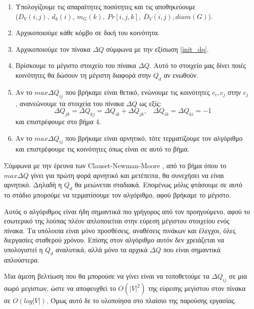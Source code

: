 \documentclass[12pt, letterpaper]{article}
\newcommand{\en}{\selectlanguage{english}}
\newcommand{\gr}{\selectlanguage{greek}}
\begin{document}
\begin{enumerate}
  \item Υπολογίζουμε τις απαραίτητες ποσότητες και τις αποθηκεύουμε \\ ($D_V(i,j), \ d_k(i), \ m_G(k), \ Pr[i,j,k],  \ \overline{D_V(i,j)},diam(G)$).
  \item Αρχικοποιούμε κάθε κόμβο σε δική του κοινότητα.
  \item Αρχικοποιούμε τον πίνακα $\Delta Q$ σύμφωνα με την εξίσωση \ref{init_dq}. 
  \item Βρίσκουμε το μέγιστο στοιχείο του πίνακα $\Delta Q$. Αυτό το στοιχείο μας 
  δίνει ποιές κοινότητες θα δώσουν τη μέγιστη διαφορά στην $Q_d$ αν ενωθούν.
  \item Αν το $max \Delta Q_{ij}$ που βρήκαμε είναι θετικό, ενώνουμε τις κοινότητες 
  $c_i, c_j$ στην $c_j$, ανανεώνουμε τα στοιχεία του πίνακα $\Delta Q$ ως εξίς:
  \[ \Delta Q_{jk} = \Delta Q_{kj} = \Delta Q_{ik} + \Delta Q_{jk}, \ \ \ \ \Delta Q_{ik} = \Delta Q_{ki} = -1 \]
  και επιστρέφουμε στο βήμα 4. 
  \item Αν το $max \Delta Q_{ij}$ που βρήκαμε είναι αρνητικό, τότε τερματίζουμε τον αλγόριθμο
  και επιστρέφουμε τις κοινότητες όπως είναι σε αυτό το βήμα. 
\end{enumerate}





Σύμφωνα με την έρευνα των \en Clauset-Newman-Moore \gr \cite{Clauset:fastgreedy},
από το βήμα όπου το $max \Delta Q$ γίνει για πρώτη φορά αρνητικό και μετέπειτα, θα 
συνεχήσει να είναι αρνητικό. Δηλαδή η $Q_d$ θα μειώνεται σταδιακά. Επομένως μόλις φτάσουμε 
σε αυτό το στάδιο μπορούμε να τερματίσουμε τον αλγόριθμο, αφού βρήκαμε το μέγιστο. 

Αυτός ο αλγόριθμος είναι ήδη σημαντικά πιο γρήγορος από τον προηγούμενο, αφού το εσωτερικό 
της λούπας πλέον απλοποιείται στην εύρεση μέγιστου στοιχείου ενός πίνακα. Τα υπόλοιπα είναι 
μόνο προσθέσεις, αναθέσεις πινάκων και έλεγχοι, όλες διεργασίες 
σταθερού χρόνου. Επίσης στον αλγόριθμο αυτόν δεν χρειάζεται να υπολογιστεί η $Q_d$ 
αναλυτικά, αλλά μόνο τα αρχικά $\Delta Q$ που είναι σημαντικά απλούστερα.

Μια άμεση βελτίωση που θα μπορούσε να γίνει \cite{Clauset:fastgreedy} είναι να τοποθετούμε 
τα $\Delta Q_{ij}$ σε μια σωρό μεγίστων, ώστε να αποφευχθεί το $O(|V|^2)$ της εύρεσης 
μεγίστου στον πίνακα σε $O(log|V|)$. Όμως αυτό δε το υλοποίησα στο πλαίσιο της παρούσης 
εργασίας.
\end{document}
